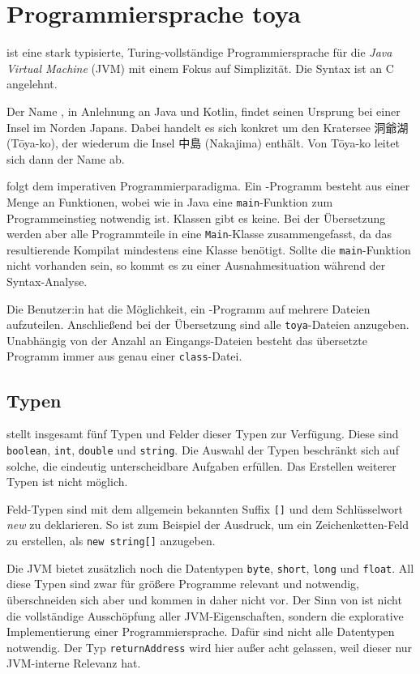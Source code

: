 \chapter{Programmiersprache toya}
\label{cha:toya}

\Toya ist eine stark typisierte, Turing-vollständige Programmiersprache für die \textit{Java Virtual Machine} (JVM) mit einem Fokus auf Simplizität. Die Syntax ist an C angelehnt.

\begin{CJK}{UTF8}{ipxm}
Der Name \toya, in Anlehnung an Java und Kotlin, findet seinen Ursprung bei einer Insel im Norden Japans. Dabei handelt es sich konkret um den Kratersee 洞爺湖 (Tōya-ko), der wiederum die Insel 中島 (Nakajima) enthält. Von Tōya-ko leitet sich dann der Name \toya ab.
\end{CJK}

\Toya folgt dem imperativen Programmierparadigma. Ein \toya-Programm besteht aus einer Menge an Funktionen, wobei wie in Java eine \texttt{main}-Funktion zum Programmeinstieg notwendig ist. Klassen gibt es keine. Bei der Übersetzung werden aber alle Programmteile in eine \texttt{Main}-Klasse zusammengefasst, da das resultierende Kompilat mindestens eine Klasse benötigt. Sollte die \texttt{main}-Funktion nicht vorhanden sein, so kommt es zu einer Ausnahmesituation während der Syntax-Analyse.

Die Benutzer:in hat die Möglichkeit, ein \toya-Programm auf mehrere Dateien aufzuteilen. Anschließend bei der Übersetzung sind alle \texttt{toya}-Dateien anzugeben. Unabhängig von der Anzahl an Eingangs-Dateien besteht das übersetzte Programm immer aus genau einer \texttt{class}-Datei.  

\section{Typen}

\Toya stellt insgesamt fünf Typen und Felder dieser Typen zur Verfügung. Diese sind \texttt{boolean}, \texttt{int}, \texttt{double} und \texttt{string}. Die Auswahl der Typen beschränkt sich auf solche, die eindeutig unterscheidbare Aufgaben erfüllen. Das Erstellen weiterer Typen ist nicht möglich.

Feld-Typen sind mit dem allgemein bekannten Suffix \texttt{[]} und dem Schlüsselwort \textit{new} zu deklarieren. So ist zum Beispiel der Ausdruck, um ein Zeichenketten-Feld zu erstellen, als \texttt{new string[]} anzugeben.

Die JVM bietet zusätzlich noch die Datentypen \texttt{byte}, \texttt{short}, \texttt{long} und \texttt{float}. All diese Typen sind zwar für größere Programme relevant und notwendig, überschneiden sich aber und kommen in \toya daher nicht vor. Der Sinn von \toya ist nicht die vollständige Ausschöpfung aller JVM-Eigenschaften, sondern die explorative Implementierung einer Programmiersprache. Dafür sind nicht alle Datentypen notwendig. Der Typ \texttt{returnAddress} wird hier außer acht gelassen, weil dieser nur JVM-interne Relevanz hat.

